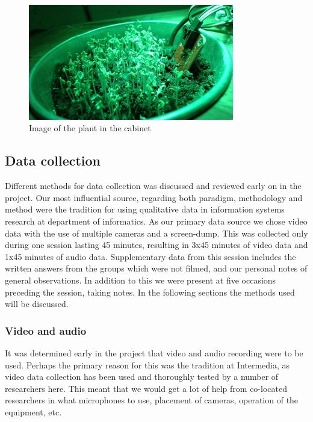 \begin{figure}
\centering
\includegraphics[width=0.8\textwidth]{img/empiricalsetting/cupboardsystem.jpg}
\caption{Image of the plant in the cabinet}
\label{fig:cabinetsystemplant}
\end{figure}


\subsection{Data collection}
Different methods for data collection was discussed and reviewed early on in the project. Our most influential source, regarding both paradigm, methodology and method were the tradition for using qualitative data in information systems research at department of informatics. As our primary data source we chose video data with the use of multiple cameras and a screen-dump. This was collected only during one session lasting 45 minutes, resulting in 3x45 minutes of video data and 1x45 minutes of audio data. Supplementary data from this session includes the written answers from the groups which were not filmed, and our personal notes of general observations. In addition to this we were present at five occasions preceding the session, taking notes. In the following sections the methods used will be discussed. 

\subsubsection{Video and audio}
It was determined early in the project that video and audio recording were to be used. Perhaps the primary reason for this was the tradition at Intermedia, as video data collection has been used and thoroughly tested by a number of researchers here. This meant that we would get a lot of help from co-located researchers in what microphones to use, placement of cameras, operation of the equipment, etc. 

